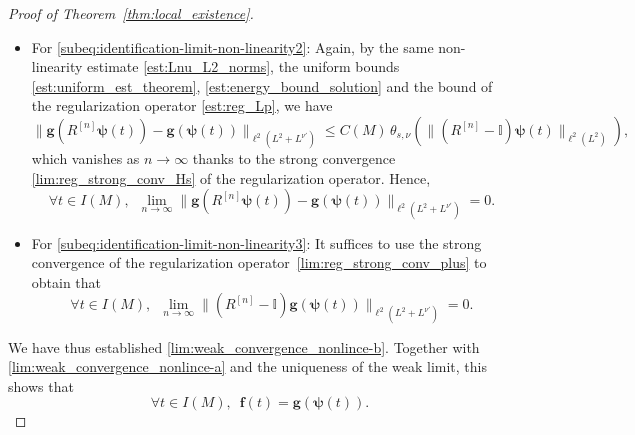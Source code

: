 \documentclass[12pt,a4paper]{amsart}
\numberwithin{equation}{section}
\newcommand{\ulg}{\boldsymbol{g}}
\newcommand{\ulpsi}{\boldsymbol{\psi}}
\newcommand{\ulf}{\boldsymbol{f}}
\newcommand{\thetasnu}{\theta_{s,\nu}}
\begin{document}
\begin{proof}[Proof of Theorem~\ref{thm:local_existence}]
\begin{itemize}
\begin{align}
				& \leq C(M) \, \thetasnu (\| R^{[n]}\ulpsi^{[n]}_{k}(t)-R^{[n]}\ulpsi_k(t) \|_{\ell^2(L^2)})  \\
				& \leq C(M) \, \thetasnu  (\| \ulpsi^{[n]}(t)-\ulpsi(t) \|_{\ell^2(L^2)}),
			\end{align}
			where we have used \eqref{est:reg_Lp} and \eqref{lim:reg_strong_conv_Hs} to drop the dependence on the regularizing operator. Therefore,  by the strong convergence in norm \eqref{lim:strong_convergence_ell_L2}, we have that for all $t \in I(M) $,
			\begin{equation}
				\lim_{n \rightarrow \infty} \big\| \ulg(R^{[n]}\ulpsi^{[n]}(t) ) - \ulg( R^{[n]} \ulpsi(t) ) \big\|_{\ell^2(L^2+ L^{\nu'})} = 0.
			\end{equation}
			\item For \eqref{subeq:identification-limit-non-linearity2}: Again, by the same non-linearity estimate \eqref{est:Lnu_L2_norms}, the uniform bounds \eqref{est:uniform_est_theorem}, \eqref{est:energy_bound_solution} and the bound of the regularization operator \eqref{est:reg_Lp},  we have
			\begin{equation}
				\big\| \ulg( R^{[n]} \ulpsi(t) ) - \ulg( \ulpsi(t) ) \big\|_{\ell^2(L^2+ L^{\nu'})} \leq C(M) \, \thetasnu  (\| (R^{[n]}-\mathbb{I})\ulpsi(t) \|_{\ell^2(L^2)}),
			\end{equation}
			which vanishes as $n\to\infty$ thanks to the strong convergence \eqref{lim:reg_strong_conv_Hs} of the regularization operator. Hence,
			\begin{equation}
				\forall t \in I(M), \;\ \lim_{n \rightarrow \infty} \big\| \ulg( R^{[n]} \ulpsi(t) ) - \ulg( \ulpsi(t) ) \big\|_{\ell^2(L^2+ L^{\nu'})} = 0 .
			\end{equation}
			\item For \eqref{subeq:identification-limit-non-linearity3}: It suffices to use the strong convergence of the regularization operator~\eqref{lim:reg_strong_conv_plus} %
			to obtain that 
			\begin{equation}
				\forall t \in I(M), \;\ \lim_{n \rightarrow \infty} \big\| ( R^{[n]} - \mathbb{I}) \ulg( \ulpsi(t) ) \big\|_{\ell^2(L^2+ L^{\nu'})} = 0 .
			\end{equation}
		\end{itemize}
		We have thus established \eqref{lim:weak_convergence_nonlince-b}. Together with \eqref{lim:weak_convergence_nonlince-a} and the uniqueness of the weak limit, this shows that 
		\begin{equation}
			\forall t \in I(M), \;\ \ulf(t) =  \ulg (\ulpsi(t) ) .
		\end{equation}
		

\end{proof}
\end{document}
